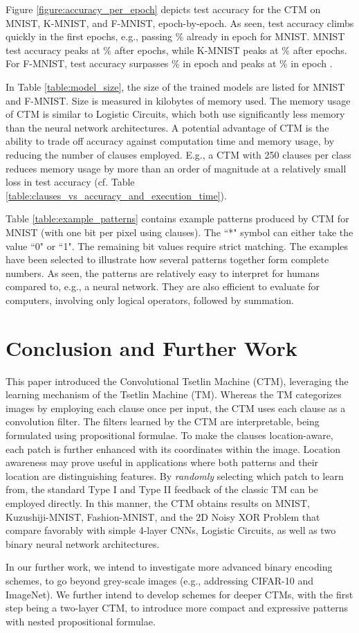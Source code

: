 \documentclass{article}
\begin{document}
  Figure \ref{figure:accuracy_per_epoch} depicts test accuracy for the CTM on MNIST, K-MNIST, and F-MNIST, epoch-by-epoch. As seen, test accuracy climbs quickly in the first epochs, e.g., passing \% already in epoch  for MNIST. MNIST test accuracy peaks at \% after  epochs, while K-MNIST peaks at \% after  epochs. For F-MNIST, test accuracy surpasses \% in epoch  and peaks at \% in epoch .
  
In Table \ref{table:model_size}, the size of the trained models are listed for MNIST and F-MNIST. Size is measured in kilobytes of memory used. The memory usage of CTM is similar to Logistic Circuits, which both use significantly less memory than the neural network architectures. A potential advantage of CTM is the ability to trade off accuracy against computation time and memory usage, by reducing the number of clauses employed. E.g., a CTM with 250 clauses per class reduces memory usage by more than an order of magnitude at a relatively small loss in test accuracy (cf. Table \ref{table:clauses_vs_accuracy_and_execution_time}). 
 
Table \ref{table:example_patterns} contains example patterns produced by CTM for MNIST (with one bit per pixel using  clauses). The ``*" symbol can either take the value ``0" or ``1". The remaining bit values require strict matching. The examples have been selected to illustrate how several patterns together form complete numbers. As seen, the patterns are relatively easy to interpret for humans compared to, e.g., a neural network. They are also efficient to evaluate for computers, involving only logical operators, followed by summation.
 
\section{Conclusion and Further Work}
\label{sec:conclusion}

This paper introduced the Convolutional Tsetlin Machine (CTM), leveraging the learning mechanism of the Tsetlin Machine (TM). Whereas the TM categorizes images by employing each clause once per  input, the CTM uses each clause as a   convolution filter. The filters learned by the CTM are interpretable, being formulated using propositional formulae. To make the clauses location-aware, each patch is further enhanced with its coordinates within the image. Location awareness may prove useful in applications where both patterns and their location are distinguishing features. By \emph{randomly} selecting which patch to learn from, the standard Type I and Type II feedback of the classic TM can be employed directly. In this manner, the CTM obtains results on MNIST, Kuzushiji-MNIST, Fashion-MNIST, and the 2D Noisy XOR Problem that compare favorably with simple 4-layer CNNs, Logistic Circuits, as well as two binary neural network architectures.

In our further work, we intend to investigate more advanced binary encoding schemes, to go beyond grey-scale images (e.g., addressing CIFAR-10 and ImageNet). We further intend to develop schemes for deeper CTMs, with the first step being a two-layer CTM, to introduce more compact and expressive patterns with nested propositional formulae.



\end{document}
